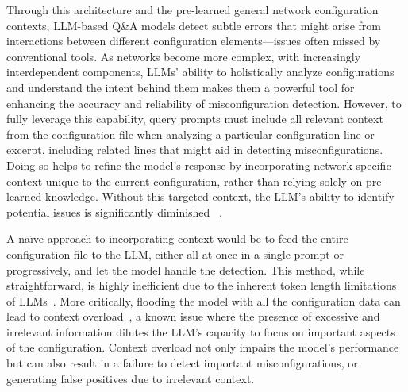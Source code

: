 Through this architecture and the pre-learned general network configuration contexts, LLM-based Q\&A models detect subtle errors that might arise from interactions between different configuration elements—issues often missed by conventional tools. As networks become more complex, with increasingly interdependent components, LLMs' ability to holistically analyze configurations and understand the intent behind them makes them a powerful tool for enhancing the accuracy and reliability of misconfiguration detection.
However, to fully leverage this capability, query
prompts must include all relevant context from the configuration file
when analyzing a particular configuration line or excerpt,
including related lines that might aid in detecting misconfigurations. 
Doing so helps to refine the model's response by incorporating network-specific context unique to the current configuration, rather than relying solely on pre-learned knowledge. Without this targeted context, the LLM's ability to identify potential issues is significantly diminished ~\cite{liskavets2024prompt,tian2024examining,khurana2024and, shvartzshnaider2024llm}.

 A na\"{i}ve approach to incorporating context would be to feed the entire
configuration file to the LLM, either all at once in a single prompt or
progressively, and let the model handle the detection. This method, while
straightforward, is highly inefficient due to the inherent token length
limitations of LLMs~\cite{xue2024repeat,yu2024breaking,gu2023mamba}. More
critically, flooding the model with all the configuration data can lead to
context overload~\cite{lican,li2024long,qian2024long}, a known issue where the
presence of excessive and irrelevant information dilutes the LLM’s capacity to
focus on important aspects of the configuration. Context overload not only
impairs the model’s performance but
can also result in a failure to detect important misconfigurations, or generating false positives
due to irrelevant context. 

